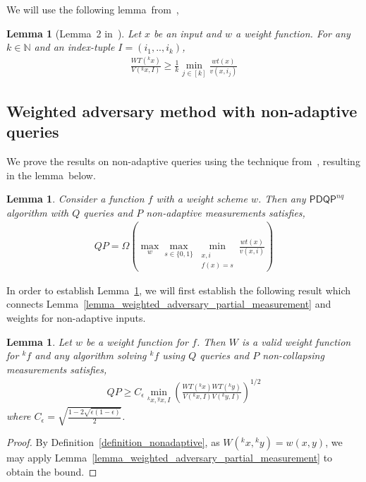 \documentclass[10pt,a4paper]{article}
\newcommand{\queryamount}[0]{\ensuremath{Q}\xspace}
\newcommand{\abilityamount}[0]{\ensuremath{P}\xspace} %
\newcommand{\nonadaptivelabel}[0]{\ensuremath{nq}\xspace}
\newcommand{\compclass}[2][]{\ensuremath{\mathsf{#2}^{#1}}\xspace}
\newcommand{\pdqpnaqname}[0]{\compclass[\nonadaptivelabel]{PDQP}}
\newtheorem{lemma}[theorem]{Lemma}
\begin{document}
We will use the following lemma~from~\cite{nonadaptive_weighted_adversary},

\begin{lemma}[Lemma~2 in~\cite{nonadaptive_weighted_adversary}]\label{lemma_nonadaptive_average_weights}
    Let $x$ be an input and $w$ a weight function. For any $k\in \mathbb{N}$ and an index-tuple $I=(i_1,..,i_k)$,
    \begin{align*}
        \frac{WT({}^kx)}{V({}^kx, I)} \geq \frac{1}{k} \min_{j\in [k]}\frac{wt(x)}{v(x,i_j)}
    \end{align*}
\end{lemma}


\subsection{Weighted adversary method with non-adaptive queries}

We prove the results on non-adaptive queries using the technique from~\cite{nonadaptive_weighted_adversary}, resulting in the lemma~below.

\begin{lemma}\label{lemma_nonadaptive}
    Consider a function $f$ with a weight scheme $w$. Then any \pdqpnaqname algorithm with \queryamount queries and \abilityamount non-adaptive measurements satisfies,
     \begin{align*}
        \queryamount\abilityamount = \Omega \left( \max_w \max_{s\in \{0,1\}} \min_{\substack{x,i \\ f(x)=s}} \frac{wt(x)}{v(x,i)} \right)
    \end{align*}
\end{lemma}

In order to establish Lemma~\ref{lemma_nonadaptive}, we will first establish the following result which connects Lemma~\ref{lemma_weighted_adversary_partial_measurement} and weights for non-adaptive inputs.

\begin{lemma}\label{lemma_nonadaptive_weights}
    Let $w$ be a weight function for $f$. Then $W$ is a valid weight function for ${}^kf$ and any algorithm solving ${}^kf$ using \queryamount queries and \abilityamount non-collapsing measurements satisfies,
    \begin{align*}
        \queryamount\abilityamount \geq C_{\epsilon} \min_{{}^kx, {}^yx, I} \left(\frac{WT({}^kx) WT({}^ky)}{V({}^kx, I)V({}^ky,I)}\right)^{1/2}
    \end{align*}
    where $C_{\epsilon} = \sqrt{\frac{1-2\sqrt{\epsilon (1-\epsilon)}}{2}}$.
\end{lemma}
\begin{proof}
    By Definition~\ref{definition_nonadaptive}, as $W({}^kx, {}^ky)=w(x,y)$, we may apply Lemma~\ref{lemma_weighted_adversary_partial_measurement} to obtain the bound.
\end{proof}
\end{document}
